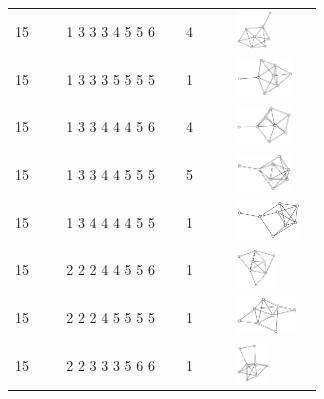 \begin{table}[h!]
\begin{tabular}{m{0.15\linewidth} m{0.35\linewidth} m{0.15\linewidth} m{0.25\linewidth}}
15 & 1 3 3 3 4 5 5 6 & 4 & \includegraphics[height=1cm]{15-universal-graphs/img/degree-sequences-example-graphs/graph-4-8-103}\\
15 & 1 3 3 3 5 5 5 5 & 1 & \includegraphics[height=1cm]{15-universal-graphs/img/degree-sequences-example-graphs/graph-4-8-104}\\
15 & 1 3 3 4 4 4 5 6 & 4 & \includegraphics[height=1cm]{15-universal-graphs/img/degree-sequences-example-graphs/graph-4-8-105}\\
15 & 1 3 3 4 4 5 5 5 & 5 & \includegraphics[height=1cm]{15-universal-graphs/img/degree-sequences-example-graphs/graph-4-8-106}\\
15 & 1 3 4 4 4 4 5 5 & 1 & \includegraphics[height=1cm]{15-universal-graphs/img/degree-sequences-example-graphs/graph-4-8-107}\\
15 & 2 2 2 4 4 5 5 6 & 1 & \includegraphics[height=1cm]{15-universal-graphs/img/degree-sequences-example-graphs/graph-4-8-108}\\
15 & 2 2 2 4 5 5 5 5 & 1 & \includegraphics[height=1cm]{15-universal-graphs/img/degree-sequences-example-graphs/graph-4-8-109}\\
15 & 2 2 3 3 3 5 6 6 & 1 & \includegraphics[height=1cm]{15-universal-graphs/img/degree-sequences-example-graphs/graph-4-8-110}\\

\end{tabular}
\end{table}
